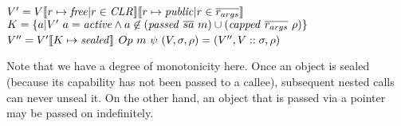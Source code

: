 \documentclass[10pt,conference]{ieeetran}%
\theoremstyle{definition}
\begin{document}
               {\(V' = V \llbracket r \mapsto \mathit{free} | r \in \mathit{CLR} \rrbracket
                 \llbracket r \mapsto \mathit{public} | r \in \overline{r_{args}} \rrbracket\)}
               {\(K = \{a | V' ~ a = \mathit{active} \land a \not \in (\mathit{passed} ~ \overline{sa} ~ m) \cup (\mathit{capped} ~ \overline{r_{args}} ~ \rho) \}\)}
               {\(V'' = V'\llbracket K \mapsto \mathit{sealed} \rrbracket\)}
               {\(Op ~ m ~ \psi ~ (V,\sigma,\rho) =
                 (V'',V::\sigma,\rho)\)}

Note that we have a degree of monotonicity here. Once an object is sealed (because its
capability has not been passed to a callee), subsequent nested calls can never unseal it.
On the other hand, an object that is passed via a pointer may be passed on indefinitely.
\end{document}
